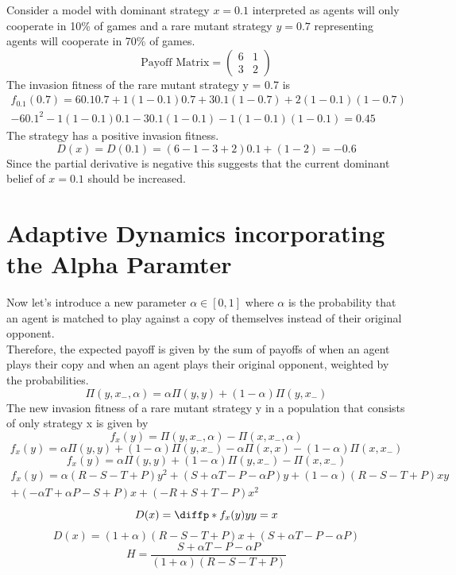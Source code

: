 \documentclass[]{llncs}
\begin{document}
Consider a model with dominant strategy $x = 0.1$ interpreted as agents will only cooperate in 10\% of games and a rare mutant strategy $y = 0.7$ representing agents will cooperate in 70\% of games. 
\[
   \text{Payoff Matrix} = \begin{pmatrix} 
   6 & 1  \\
   3 & 2  
   \end{pmatrix} 
\]
The invasion fitness of the rare mutant strategy y = 0.7 is 
\begin{multline}
f_{0.1}(0.7) = 6 0.1 0.7 + 1 (1-0.1) 0.7 +  3 0.1 (1-0.7) + 2 (1-0.1) (1-0.7) \\ - 6 0.1^2 - 1 (1-0.1) 0.1 - 3 0.1 (1-0.1) - 1 (1-0.1) (1-0.1) = 0.45
\end{multline}
The strategy has a positive invasion fitness.
\[
D(x) = D(0.1) = (6 - 1 - 3 +2) 0.1 + (1-2) = -0.6
\]
Since the partial derivative is negative this suggests that the current dominant belief of $x = 0.1$ should be increased. 


\section{Adaptive Dynamics incorporating the Alpha Paramter}

Now let's introduce a new parameter $\alpha \in [0, 1]$ where $\alpha$ is the probability that an agent is matched to play against a copy of themselves instead of their original opponent. 
\\
Therefore, the expected payoff is given by the sum of payoffs of when an agent plays their copy and when an agent plays their original opponent, weighted by the probabilities.
\[ 
\Pi ( y, x_{-}, \alpha ) = \alpha \Pi ( y, y) + (1-\alpha) \Pi ( y, x_{-} )
\]
The new invasion fitness of a rare mutant strategy y in a population that consists of only strategy x is given by 
\[
f_x(y) = \Pi ( y, x_{-}, \alpha ) - \Pi ( x, x_{-}, \alpha )
\]
\[
f_x(y) = \alpha \Pi ( y, y) + (1-\alpha) \Pi ( y, x_{-} ) - \alpha \Pi ( x, x) - (1-\alpha) \Pi ( x,  x_{-} )
\]
\[
f_x(y) = \alpha \Pi ( y, y) + (1-\alpha) \Pi ( y, x_{-} ) - \Pi ( x,  x_{-} )
\]
\begin{multline}
f_x(y) = \alpha (R-S-T+P) y^2 +(S + \alpha T - P - \alpha P) y + (1-\alpha) (R-S-T+P) x y \\+ (-\alpha T + \alpha P - S + P) x + (-R+S+T-P) x^2
\end{multline}
\[
D(x) = \diffp*{f_x(y)}{y}{y=x}
\]
\[
D(x) = (1+\alpha) (R-S-T+P) x + (S + \alpha T - P - \alpha P) 
\]
\[
H = \frac{S + \alpha T - P - \alpha P}{(1+\alpha)(R-S-T+P)}
\]
\end{document}
